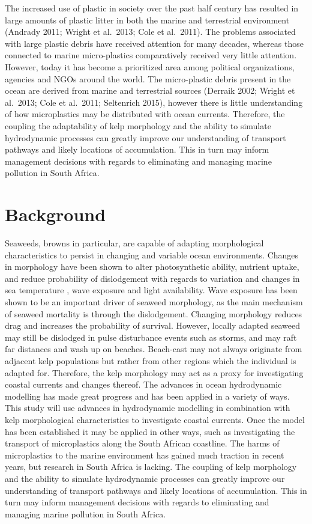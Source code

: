 \documentclass[]{article}
\begin{document}
The increased use of plastic in society over the past half century has
resulted in large amounts of plastic litter in both the marine and
terrestrial environment (Andrady 2011; Wright et al.~2013; Cole et
al.~2011). The problems associated with large plastic debris have
received attention for many decades, whereas those connected to marine
micro-plastics comparatively received very little attention. However,
today it has become a prioritized area among political organizations,
agencies and NGOs around the world. The micro-plastic debris present in
the ocean are derived from marine and terrestrial sources (Derraik 2002;
Wright et al.~2013; Cole et al.~2011; Seltenrich 2015), however there is
little understanding of how microplastics may be distributed with ocean
currents. Therefore, the coupling the adaptability of kelp morphology
and the ability to simulate hydrodynamic processes can greatly improve
our understanding of transport pathways and likely locations of
accumulation. This in turn may inform management decisions with regards
to eliminating and managing marine pollution in South Africa.

\hypertarget{background}{%
\section{Background}\label{background}}

Seaweeds, browns in particular, are capable of adapting morphological
characteristics to persist in changing and variable ocean environments.
Changes in morphology have been shown to alter photosynthetic ability,
nutrient uptake, and reduce probability of dislodgement with regards to
variation and changes in sea temperature , wave exposure and light
availability. Wave exposure has been shown to be an important driver of
seaweed morphology, as the main mechanism of seaweed mortality is
through the dislodgement. Changing morphology reduces drag and increases
the probability of survival. However, locally adapted seaweed may still
be dislodged in pulse disturbance events such as storms, and may raft
far distances and wash up on beaches. Beach-cast may not always
originate from adjacent kelp populations but rather from other regions
which the individual is adapted for. Therefore, the kelp morphology may
act as a proxy for investigating coastal currents and changes thereof.
The advances in ocean hydrodynamic modelling has made great progress and
has been applied in a variety of ways. This study will use advances in
hydrodynamic modelling in combination with kelp morphological
characteristics to investigate coastal currents. Once the model has been
established it may be applied in other ways, such as investigating the
transport of microplastics along the South African coastline. The harms
of microplastics to the marine environment has gained much traction in
recent years, but research in South Africa is lacking. The coupling of
kelp morphology and the ability to simulate hydrodynamic processes can
greatly improve our understanding of transport pathways and likely
locations of accumulation. This in turn may inform management decisions
with regards to eliminating and managing marine pollution in South
Africa.
\end{document}
